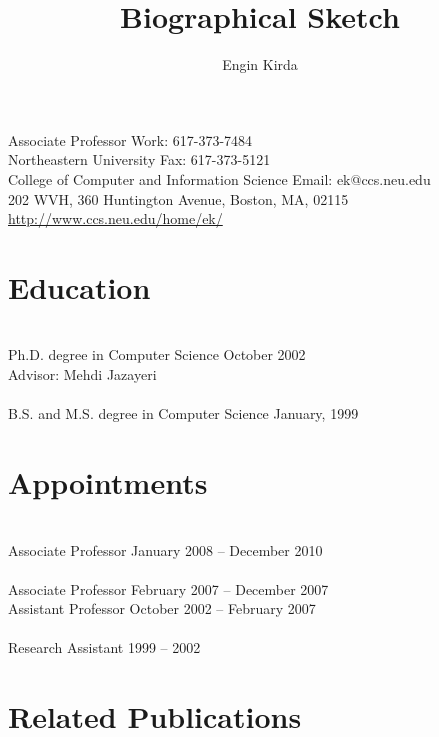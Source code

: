 \documentclass[letterpaper,11pt]{scrartcl}
\begin{document}
\title{Biographical Sketch}
\subtitle{Engin Kirda}
\author{}
\date{}
\maketitle

\noindent Associate Professor \hfill Work: 617-373-7484\\
Northeastern University \hfill Fax: 617-373-5121\\
College of Computer and Information Science \hfill Email: ek@ccs.neu.edu\\
202 WVH, 360 Huntington Avenue, Boston, MA, 02115 \hfill \url{http://www.ccs.neu.edu/home/ek/}

\section*{Education}

\\
{\sc Ph.D. degree in Computer Science} \hfill October 2002\\
{\sc Advisor}: Mehdi Jazayeri\\

\\
{\sc B.S. and M.S. degree in Computer Science} \hfill January, 1999

\section*{Appointments}

\\
{\sc Associate Professor} \hfill January 2008 -- December 2010\\

\\
{\sc Associate Professor} \hfill February 2007 -- December 2007\\
{\sc Assistant Professor} \hfill October 2002 -- February 2007\\

\\
{\sc Research Assistant} \hfill 1999 -- 2002

\section*{Related Publications}
\end{document}
